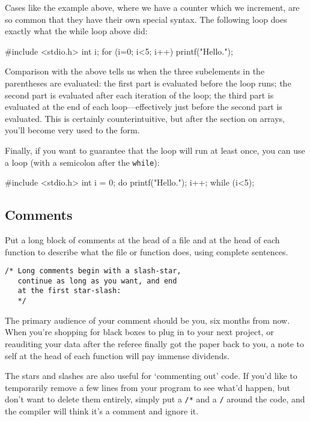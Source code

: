 \documentclass[12pt]{article}
\makeatletter
\def\ttind#1{\index{#1@{\tt #1}}{\tt #1}}
\makeatother
\begin{document}
Cases like the example above, where we have a counter which we increment, are so common that they have
their own special syntax. The following  loop does exactly what the while loop above did:

#include <stdio.h>
int i;
for (i=0; i<5; i++){
    printf("Hello.\n");
}

Comparison with the above tells us when the three subelements in the parentheses are evaluated: the first
part is evaluated before the loop runs; the second part is evaluated after each iteration of the loop; the
third part is evaluated at the end of each loop---effectively just before the second part is evaluated.
This is certainly counterintuitive, but after the section on arrays, you'll become very used to the form.

Finally, if you want to guarantee that the loop will run at least once, you can use a \ttind{do-while} loop (with a semicolon after the {\tt while}):

#include <stdio.h>
int i = 0;
do {
    printf("Hello.\n");
    i++;
} while (i<5);

\subsection{Comments} 
Put a long block of comments 
at the head of a file and at the head of each function to describe what
the file or function does, using complete sentences.
\begin{verbatim}
/* Long comments begin with a slash-star,
   continue as long as you want, and end 
   at the first star-slash:   
   */
\end{verbatim}
The primary audience of your comment should be you, six months from
now. When you're shopping for black boxes to plug in to your next project,
or reauditing your data after the referee finally got the paper back
to you, a note to self at the head of each function will pay immense
dividends.


The stars and slashes are also useful for `commenting out' code. If you'd
like to temporarily remove a few lines from your program to see what'd
happen, but don't want to delete them entirely, simply put a {\tt /*}
and a {\tt */} around the code, and the compiler will think it's a
comment and ignore it.
\end{document}
